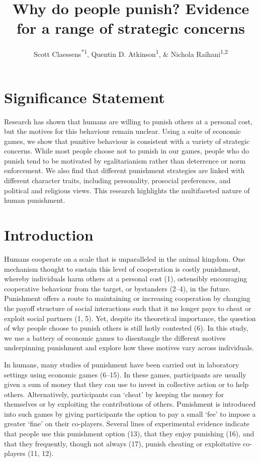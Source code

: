 \documentclass[
  man, donotrepeattitle,floatsintext]{apa6}
\title{Why do people punish? Evidence for a range of strategic concerns}
\author{Scott Claessens\textsuperscript{*1}, Quentin D. Atkinson\textsuperscript{1}, \& Nichola Raihani\textsuperscript{1,2}}
\date{}
\affiliation{\vspace{0.5cm}\textsuperscript{1} \footnotesize School of Psychology, University of Auckland, Auckland, New Zealand\\\textsuperscript{2} \footnotesize Department of Experimental Psychology, University College London, London, United Kingdom}
\begin{document}
\maketitle

\hypertarget{significance-statement}{%
\section{Significance Statement}\label{significance-statement}}

Research has shown that humans are willing to punish others at a personal cost,
but the motives for this behaviour remain unclear. Using a suite of economic
games, we show that punitive behaviour is consistent with a variety of strategic
concerns. While most people choose not to punish in our games, people who do
punish tend to be motivated by egalitarianism rather than deterrence or
norm enforcement. We also find that different punishment strategies are linked
with different character traits, including personality, prosocial preferences,
and political and religious views. This research highlights the multifaceted
nature of human punishment.

\newpage
\linenumbers

\hypertarget{introduction}{%
\section{Introduction}\label{introduction}}

Humans cooperate on a scale that is unparalleled in the animal kingdom. One
mechanism thought to sustain this level of cooperation is costly punishment,
whereby individuals harm others at a personal cost (1),
ostensibly encouraging cooperative behaviour from the target, or bystanders
(2--4), in the future. Punishment offers a
route to maintaining or increasing cooperation by changing the payoff structure
of social interactions such that it no longer pays to cheat or exploit social
partners (1, 5). Yet, despite its theoretical
importance, the question of why people choose to punish others is still hotly
contested (6). In this study, we use a battery of economic games to
disentangle the different motives underpinning punishment and explore how these
motives vary across individuals.

In humans, many studies of punishment have been carried out in laboratory
settings using economic games (6--15). In these games, participants are usually given a sum of money
that they can use to invest in collective action or to help others.
Alternatively, participants can `cheat' by keeping the money for themselves or
by exploiting the contributions of others. Punishment is introduced into such
games by giving participants the option to pay a small `fee' to impose a greater
`fine' on their co-players. Several lines of experimental evidence indicate that
people use this punishment option (13), that they enjoy
punishing (16), and that they frequently, though not
always (17), punish cheating or exploitative
co-players (11, 12).
\end{document}
